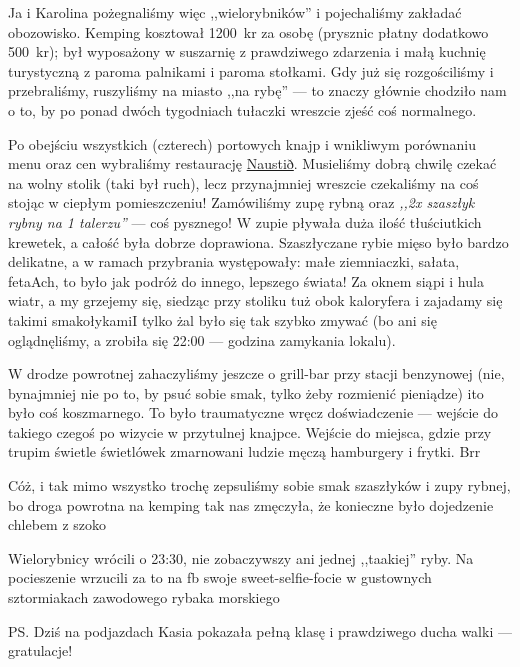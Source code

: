 
Ja i Karolina pożegnaliśmy więc ,,wielorybników'' i pojechaliśmy zakładać obozowisko. Kemping kosztował 1200~kr za osobę (prysznic płatny dodatkowo 500~kr); był wyposażony w suszarnię z prawdziwego zdarzenia i małą kuchnię turystyczną z paroma palnikami i paroma stołkami. Gdy już się rozgościliśmy i przebraliśmy, ruszyliśmy na miasto ,,na rybę'' --- to znaczy głównie chodziło nam o to, by po ponad dwóch tygodniach tułaczki wreszcie zjeść coś normalnego.

Po obejściu wszystkich (czterech) portowych knajp i wnikliwym porównaniu menu oraz cen wybraliśmy restaurację \href{https://www.facebook.com/naustid}{Naustið}. Musieliśmy dobrą chwilę czekać na wolny stolik (taki był ruch), lecz przynajmniej wreszcie czekaliśmy na coś stojąc w ciepłym pomieszczeniu! Zamówiliśmy zupę rybną oraz \emph{,,2x szaszłyk rybny na 1 talerzu''} --- coś pysznego! W zupie pływała duża ilość tłuściutkich krewetek, a całość była dobrze doprawiona. Szaszłyczane rybie mięso było bardzo delikatne, a w ramach przybrania występowały: małe ziemniaczki, sałata, feta\textellipsis Ach, to było jak podróż do innego, lepszego świata! Za oknem siąpi i hula wiatr, a my grzejemy się, siedząc przy stoliku tuż obok kaloryfera i zajadamy się takimi smakołykami\textellipsis I tylko żal było się tak szybko zmywać (bo ani się oglądnęliśmy, a zrobiła się 22:00 --- godzina zamykania lokalu).

W drodze powrotnej zahaczyliśmy jeszcze o grill-bar przy stacji benzynowej (nie, bynajmniej nie po to, by psuć sobie smak, tylko żeby rozmienić pieniądze) i\textellipsis to było coś koszmarnego. To było traumatyczne wręcz doświadczenie --- wejście do takiego czegoś po wizycie w przytulnej knajpce. Wejście do miejsca, gdzie przy trupim świetle świetlówek zmarnowani ludzie męczą hamburgery i frytki. Brr\textellipsis


Cóż, i tak mimo wszystko trochę zepsuliśmy sobie smak szaszłyków i zupy rybnej, bo droga powrotna na kemping tak nas zmęczyła, że konieczne było dojedzenie chlebem z szoko\textellipsis

Wielorybnicy wrócili o 23:30, nie zobaczywszy ani jednej ,,taakiej'' ryby. Na pocieszenie wrzucili za to na fb swoje sweet-selfie-focie w gustownych sztormiakach zawodowego rybaka morskiego \wink

PS. Dziś na podjazdach Kasia pokazała pełną klasę i prawdziwego ducha walki --- gratulacje!
